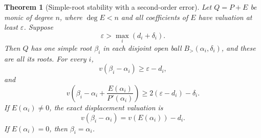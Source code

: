 \documentclass[11pt,letterpaper]{article}
\numberwithin{equation}{section}
\newtheorem{theorem}{Theorem}[section]
\theoremstyle{definition}
\theoremstyle{remark}\newtheorem{remark}[theorem]{Remark}
\newcommand{\Bgt}[2]{B_{>}(#1,#2)}
\begin{document}
\begin{theorem}[Simple-root stability with a second-order error]
\label{thm:separated}
Let $Q=P+E$ be monic of degree $n$, where $\deg E<n$ and all
coefficients of $E$ have valuation at least $\varepsilon$. Suppose
\begin{equation}\label{eq:separationcondition}
 \varepsilon>\max_i(d_i+\delta_i).
\end{equation}
Then $Q$ has one simple root $\beta_i$ in each disjoint open ball
$\Bgt{\alpha_i}{\delta_i}$, and these are all its roots. For every $i$,
\begin{equation}\label{eq:rootwisebound}
 v(\beta_i-\alpha_i)\ge\varepsilon-d_i,
\end{equation}
and
\begin{equation}\label{eq:newtonerror}
 v\left(\beta_i-\alpha_i+
             \frac{E(\alpha_i)}{P'(\alpha_i)}\right)
 \ge2(\varepsilon-d_i)-\delta_i.
\end{equation}
If $E(\alpha_i)\ne0$, the exact displacement valuation is
\begin{equation}\label{eq:exactdisplacement}
 v(\beta_i-\alpha_i)=v(E(\alpha_i))-d_i.
\end{equation}
If $E(\alpha_i)=0$, then $\beta_i=\alpha_i$.
\end{theorem}
\end{document}
